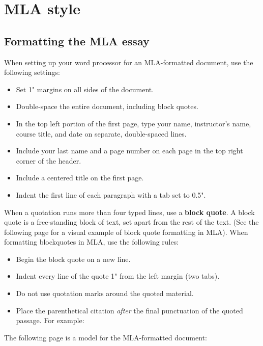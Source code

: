 
\chapter{MLA style} %


\section{Formatting the MLA essay}
When setting up your word processor for an MLA-formatted document, use the 
following settings:

\begin{itemize}
\item Set 1" margins on all sides of the document.
\item Double-space the entire document, including block quotes.
\item In the top left portion of the first page, type your name, instructor's name, 
course title, and date on separate, double-spaced lines.
\item Include your last name and a page number on each page in the top right corner 
of the header.
\item Include a centered title on the first page.
\item Indent the first line of each paragraph with a tab set to 0.5".
\end{itemize}

When a quotation runs more than four typed lines, use a \textbf{block quote}. A block 
quote is a free-standing block of text, set apart from the rest of the text. (See the 
following page for a visual example of block quote formatting in MLA). When formatting 
blockquotes in MLA, use the following rules: 

\begin{itemize}
\item Begin the block quote on a new line. 
\item Indent every line of the quote 1" from the left margin (two tabs). 
\item Do not use quotation marks around the quoted material. 
\item Place the parenthetical citation \emph{after} the final punctuation of the quoted 
passage. For example:
\end{itemize}

The following page is a model for the MLA-formatted document:

